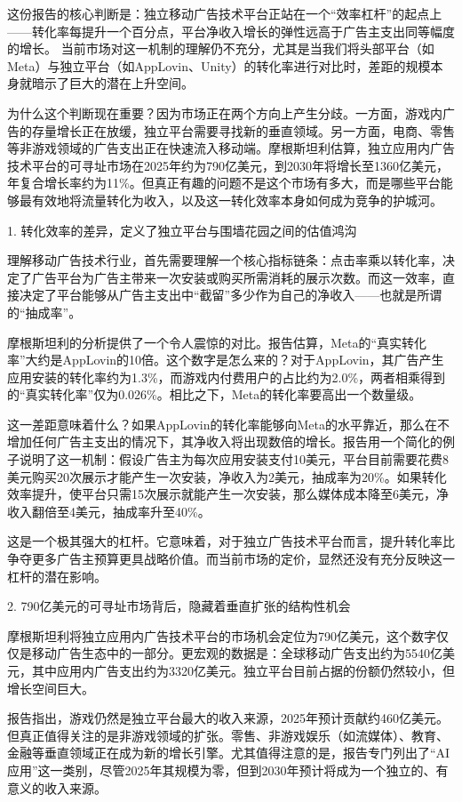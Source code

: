 \documentclass[11pt]{ctexart}
\begin{document}
这份报告的核心判断是：独立移动广告技术平台正站在一个“效率杠杆”的起点上——转化率每提升一个百分点，平台净收入增长的弹性远高于广告主支出同等幅度的增长。 当前市场对这一机制的理解仍不充分，尤其是当我们将头部平台（如Meta）与独立平台（如AppLovin、Unity）的转化率进行对比时，差距的规模本身就暗示了巨大的潜在上升空间。

为什么这个判断现在重要？因为市场正在两个方向上产生分歧。一方面，游戏内广告的存量增长正在放缓，独立平台需要寻找新的垂直领域。另一方面，电商、零售等非游戏领域的广告支出正在快速流入移动端。摩根斯坦利估算，独立应用内广告技术平台的可寻址市场在2025年约为790亿美元，到2030年将增长至1360亿美元，年复合增长率约为11\%。但真正有趣的问题不是这个市场有多大，而是哪些平台能够最有效地将流量转化为收入，以及这一转化效率本身如何成为竞争的护城河。

1. 转化效率的差异，定义了独立平台与围墙花园之间的估值鸿沟

理解移动广告技术行业，首先需要理解一个核心指标链条：点击率乘以转化率，决定了广告平台为广告主带来一次安装或购买所需消耗的展示次数。而这一效率，直接决定了平台能够从广告主支出中“截留”多少作为自己的净收入——也就是所谓的“抽成率”。

摩根斯坦利的分析提供了一个令人震惊的对比。报告估算，Meta的“真实转化率”大约是AppLovin的10倍。这个数字是怎么来的？对于AppLovin，其广告产生应用安装的转化率约为1.3\%，而游戏内付费用户的占比约为2.0\%，两者相乘得到的“真实转化率”仅为0.026\%。相比之下，Meta的转化率要高出一个数量级。

这一差距意味着什么？如果AppLovin的转化率能够向Meta的水平靠近，那么在不增加任何广告主支出的情况下，其净收入将出现数倍的增长。报告用一个简化的例子说明了这一机制：假设广告主为每次应用安装支付10美元，平台目前需要花费8美元购买20次展示才能产生一次安装，净收入为2美元，抽成率为20\%。如果转化效率提升，使平台只需15次展示就能产生一次安装，那么媒体成本降至6美元，净收入翻倍至4美元，抽成率升至40\%。

这是一个极其强大的杠杆。它意味着，对于独立广告技术平台而言，提升转化率比争夺更多广告主预算更具战略价值。而当前市场的定价，显然还没有充分反映这一杠杆的潜在影响。

2. 790亿美元的可寻址市场背后，隐藏着垂直扩张的结构性机会

摩根斯坦利将独立应用内广告技术平台的市场机会定位为790亿美元，这个数字仅仅是移动广告生态中的一部分。更宏观的数据是：全球移动广告支出约为5540亿美元，其中应用内广告支出约为3320亿美元。独立平台目前占据的份额仍然较小，但增长空间巨大。

报告指出，游戏仍然是独立平台最大的收入来源，2025年预计贡献约460亿美元。但真正值得关注的是非游戏领域的扩张。零售、非游戏娱乐（如流媒体）、教育、金融等垂直领域正在成为新的增长引擎。尤其值得注意的是，报告专门列出了“AI应用”这一类别，尽管2025年其规模为零，但到2030年预计将成为一个独立的、有意义的收入来源。
\end{document}
